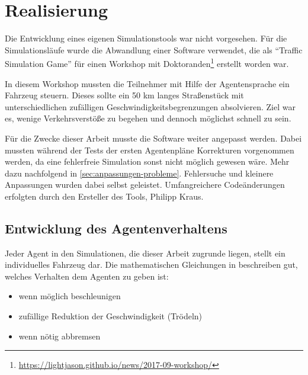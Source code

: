 \section{Realisierung}
\label{sec:realisierung}

Die Entwicklung eines eigenen Simulationstools war nicht vorgesehen.
Für die Simulationsläufe wurde die Abwandlung einer Software verwendet, die als \enquote{Traffic Simulation Game} für einen Workshop mit Doktoranden\footnote{\url{https://lightjason.github.io/news/2017-09-workshop/}} erstellt worden war.

In diesem Workshop mussten die Teilnehmer mit Hilfe der Agentensprache ein Fahrzeug steuern. Dieses sollte ein 50 km langes Straßenstück mit unterschiedlichen zufälligen Geschwindigkeitsbegrenzungen absolvieren. Ziel war es, wenige Verkehrsverstöße zu begehen und dennoch möglichst schnell zu sein.

Für die Zwecke dieser Arbeit musste die Software weiter angepasst werden.
Dabei mussten während der Tests der ersten Agentenpläne Korrekturen vorgenommen werden, da eine fehlerfreie Simulation sonst nicht möglich gewesen wäre. 
Mehr dazu nachfolgend in \cref{sec:anpassungen-probleme}.
Fehlersuche und kleinere Anpassungen wurden dabei selbst geleistet.
Umfangreichere Codeänderungen erfolgten durch den Ersteller des Tools, Philipp Kraus.




\subsection{Entwicklung des Agentenverhaltens}%
\label{sec:entwicklung-agentenplan}

Jeder Agent in den Simulationen, die dieser Arbeit zugrunde liegen, stellt ein individuelles Fahrzeug dar.
Die mathematischen Gleichungen in \cite{na-sch} beschreiben gut, welches Verhalten dem Agenten zu geben ist: 
\begin{itemize}
\itemsep0em
	\item wenn möglich beschleunigen
	\item zufällige Reduktion der Geschwindigkeit (Trödeln)
	\item wenn nötig abbremsen
\end{itemize}


